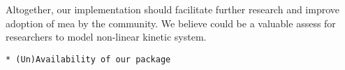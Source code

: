 Altogether, our implementation should facilitate further research and improve adoption of \acrlong{mea} by the community.
We believe \means{} could be a valuable assess for researchers to model non-linear kinetic system.
 


\begin{verbatim}
* (Un)Availability of our package
\end{verbatim}


